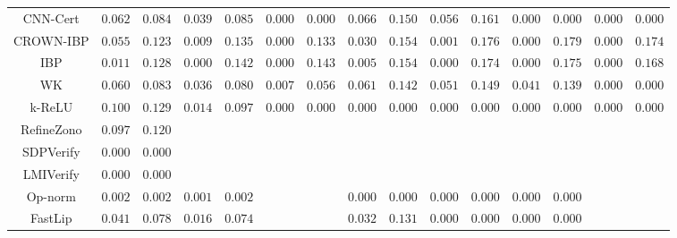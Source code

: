 \begin{table*}
{\begin{tabular}{c|c|c|c|c|c|c|c|c|c|c|c|c|c|c}
     CNN-Cert &       $0.062$ &       $0.084$ &       $0.039$ &       $0.085$ &       $0.000$ &       $0.000$ &       $0.066$ &       $0.150$ &       $0.056$ &       $0.161$ &       $0.000$ &       $0.000$ &       $0.000$ &       $0.000$ \\
    CROWN-IBP &       $0.055$ &       $0.123$ &       $0.009$ &       $0.135$ &       $0.000$ &       $0.133$ &       $0.030$ &       $0.154$ &       $0.001$ &       $0.176$ &       $0.000$ &       $0.179$ &       $0.000$ &       $0.174$ \\
          IBP &       $0.011$ &       $0.128$ &       $0.000$ &       $0.142$ &       $0.000$ &       $0.143$ &       $0.005$ &       $0.154$ &       $0.000$ &       $0.174$ &       $0.000$ &       $0.175$ &       $0.000$ &       $0.168$ \\
           WK &       $0.060$ &       $0.083$ &       $0.036$ &       $0.080$ &       $0.007$ &       $0.056$ &       $0.061$ &       $0.142$ &       $0.051$ &       $0.149$ &       $0.041$ &       $0.139$ &       $0.000$ &       $0.000$ \\
       k-ReLU &       $0.100$ &       $0.129$ &       $0.014$ &       $0.097$ &       $0.000$ &       $0.000$ &       $0.000$ &       $0.000$ &       $0.000$ &       $0.000$ &       $0.000$ &       $0.000$ &       $0.000$ &       $0.000$ \\
   RefineZono &       $0.097$ &       $0.120$ &               &               &               &               &               &               &               &               &               &               &               &               \\
    SDPVerify &       $0.000$ &       $0.000$ &               &               &               &               &               &               &               &               &               &               &               &               \\
    LMIVerify &       $0.000$ &       $0.000$ &               &               &               &               &               &               &               &               &               &               &               &               \\
      Op-norm &       $0.002$ &       $0.002$ &       $0.001$ &       $0.002$ &               &               &       $0.000$ &       $0.000$ &       $0.000$ &       $0.000$ &       $0.000$ &       $0.000$ &               &               \\
      FastLip &       $0.041$ &       $0.078$ &       $0.016$ &       $0.074$ &               &               &       $0.032$ &       $0.131$ &       $0.000$ &       $0.000$ &       $0.000$ &       $0.000$ &               &               \\

\end{tabular}}
\end{table*}
